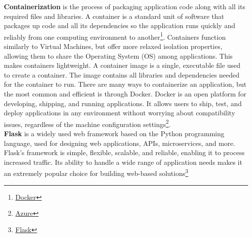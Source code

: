 \documentclass{article}
\begin{document}
\textbf{Containerization} is the process of packaging application code along with all its required files and libraries. A container is a standard unit of software that packages up code and all its dependencies so the application runs quickly and reliably from one computing environment to another\footnote{\label{docker}\href{https://www.docker.com/resources/what-container/}{Docker}}. Containers function similarly to Virtual Machines, but offer more relaxed isolation properties, allowing them to share the Operating System (OS) among applications. This makes containers lightweight. A container image is a single, executable file used to create a container. The image contains all libraries and dependencies needed for the container to run. There are many ways to containerize an application, but the most common and efficient is through Docker. Docker is an open platform for developing, shipping, and running applications. It allows users to ship, test, and deploy applications in any environment without worrying about compatibility issues, regardless of the machine configuration settings\footnote{\href{Azure:\thickspace https://www.dimensiona.com/en/what-is-docker-and-what-are-its-advantages/\#:~:text=Docker\%20is\%20a\%20container\%20platform,for\%20it\%20to\%20run\%20independently.}{Azure}}.\\

\textbf{Flask} is a widely used web framework based on the Python programming language, used for designing web applications, APIs, microservices, and more. Flask's framework is simple, flexible, scalable, and reliable, enabling it to process increased traffic. Its ability to handle a wide range of application needs makes it an extremely popular choice for building web-based solutions\footnote{\href{https://www.bairesdev.com/blog/what-is-flask/}{Flask}}\\
\end{document}
